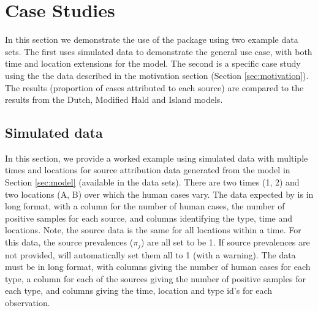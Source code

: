 
\section{Case Studies}

\begin{knitrout}
\color{fgcolor}\begin{kframe}
\begin{alltt}
\hlopt{$}\hlstd{(} \hlstd{=} \hlstd{,}  \hlstd{=} \hlstd{)}
\hlstd{()}
\end{alltt}


{\ttfamily\noindent\color{warningcolor}{\#\# Warning in parse\_objects(paths[1L]): file cache/\_\_objects not found}}

{\ttfamily\noindent\color{warningcolor}{\#\# Warning in parse\_objects(paths[2L]): file cache/\_\_globals not found}}\end{kframe}
\end{knitrout}

In this section we demonstrate the use of the  package using two example data sets. The first uses simulated data to demonstrate the general use case, with both time and location extensions for the model. The second is a specific case study using the the data described in the motivation section (Section \ref{sec:motivation}). The results (proportion of cases attributed to each source) are compared to the results from the Dutch, Modified Hald and Island models.

\subsection{Simulated data} \label{sim_study_section}

In this section, we provide a worked example using simulated data with multiple times and locations for source attribution data generated from the model in Section \ref{sec:model} (available in the  data sets). There are two times (1, 2) and two locations (A, B) over which the human cases vary. The data expected by  is in long format, with a column for the number of human cases, the number of positive samples for each source, and columns identifying the type, time and locations. Note, the source data is the same for all locations within a time. For this data, the source prevalences ($\pi_j$) are all set to be 1. If source prevalences are not provided,  will automatically set them all to 1 (with a warning). The data must be in long format, with columns giving the number of human cases for each type, a column for each of the sources giving the number of positive samples for each type, and columns giving the time, location and type id's for each observation. 

